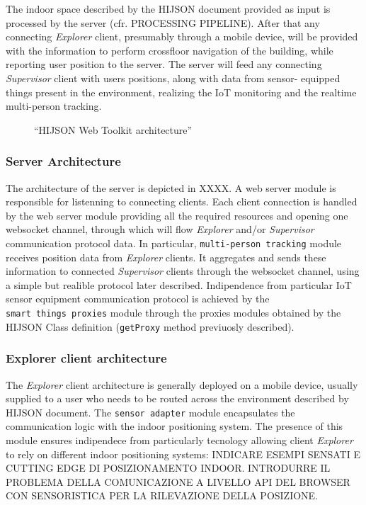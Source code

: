 \documentclass{sig-alternate}
\begin{document}
The indoor space described by the HIJSON document provided as input is
processed by the server (cfr. PROCESSING PIPELINE). After that any connecting
\emph{Explorer} client, presumably through a mobile device, will be provided
with the information to perform crossfloor navigation of the building, while
reporting user position to the server. The server will feed any connecting
\emph{Supervisor} client with users positions, along with data from sensor-
equipped things present in the environment, realizing the IoT monitoring and
the realtime multi-person tracking.

\begin{figure}[t]
\centering
{}
\caption{``HIJSON Web Toolkit architecture''}
\label{fig:pipeline}
\end{figure}

\subsubsection{Server Architecture}\label{server-architecture}

The architecture of the server is depicted in XXXX. A web server module
is responsible for listenning to connecting clients. Each client
connection is handled by the web server module providing all the
required resources and opening one websocket channel, through which will
flow \emph{Explorer} and/or \emph{Supervisor} communication protocol
data. In particular, \texttt{multi-person\ tracking} module receives
position data from \emph{Explorer} clients. It aggregates and sends
these information to connected \emph{Supervisor} clients through the
websocket channel, using a simple but realible protocol later described.
Indipendence from particular IoT sensor equipment communication protocol
is achieved by the \texttt{smart\ things\ proxies} module through the
proxies modules obtained by the HIJSON Class definition
(\texttt{getProxy} method previuosly described).

\subsubsection{Explorer client architecture}\label{explorer-client-architecture}

The \emph{Explorer} client architecture is generally deployed on a
mobile device, usually supplied to a user who needs to be routed across
the environment described by HIJSON document. The
\texttt{sensor\ adapter} module encapsulates the communication logic
with the indoor positioning system. The presence of this module ensures
indipendece from particularly tecnology allowing client \emph{Explorer}
to rely on different indoor positioning systems: INDICARE ESEMPI SENSATI
E CUTTING EDGE DI POSIZIONAMENTO INDOOR. INTRODURRE IL PROBLEMA DELLA
COMUNICAZIONE A LIVELLO API DEL BROWSER CON SENSORISTICA PER LA
RILEVAZIONE DELLA POSIZIONE.
\end{document}
